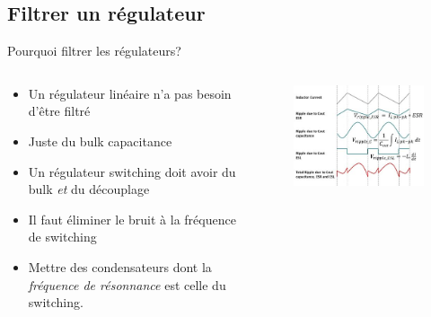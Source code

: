 \subsection{Filtrer un régulateur}

\begin{frame}{Pourquoi filtrer les régulateurs?}
    \begin{columns}
        \begin{column}{0.5\textwidth}
            \begin{itemize}
                \item Un régulateur linéaire n'a pas besoin d'être filtré
                \item Juste du bulk capacitance
                \bigskip
                \pause
                \item Un régulateur switching doit avoir du bulk \textit{et} du découplage
                \item Il faut éliminer le bruit à la fréquence de switching
                \item Mettre des condensateurs dont la \textit{fréquence de résonnance} est celle du switching.
            \end{itemize}
        \end{column}
        \begin{column}{0.5\textwidth}
            \begin{figure}
                \includegraphics[width=\textwidth, height=0.75\textheight, keepaspectratio]{pictures/switching-psu-ripple-types.png}
            \end{figure}
        \end{column}
    \end{columns}
\end{frame}

